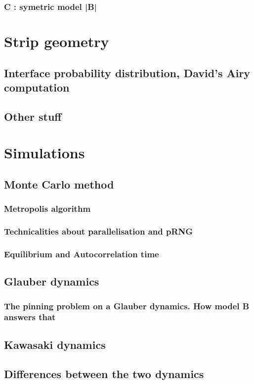 \documentclass[a4paper,11pt]{report}
\begin{document}
    \subsection{C : symetric model |B| }

\chapter{Strip geometry}
    \section{Interface probability distribution, David's Airy computation}
    \section{Other stuff}
    
\chapter{Simulations}
  \section{Monte Carlo method}
    \subsection{Metropolis algorithm}
    \subsection{Technicalities about parallelisation and pRNG}
    \subsection{Equilibrium and Autocorrelation time}
  \section{Glauber dynamics}
    \subsection{The pinning problem on a Glauber dynamics. How model B answers that}
  \section{Kawasaki dynamics}
  \section{Differences between the two dynamics}
\end{document}
